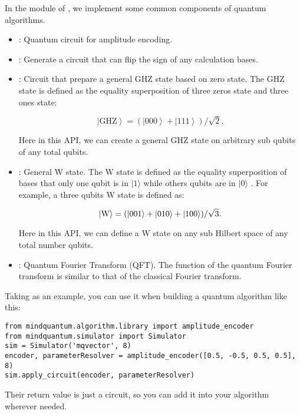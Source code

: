 In the \library module of \MindQuantum, we implement some common components of quantum algorithms.

\begin{itemize}

    \item \amplitudeencoder: Quantum circuit for amplitude encoding.

    \item \bitphaseflipoperator: Generate a circuit that can flip the sign of any calculation bases.

    \item \generalghzstate: Circuit that prepare a general GHZ state based on zero state. The GHZ state is defined as the equality superposition of three zeros state and three ones state:

          \begin{equation}
              \left|\text{GHZ}\right> = (\left|000\right> + \left|111\right>)/\sqrt{2}.
          \end{equation}

          Here in this API, we can create a general GHZ state on arbitrary sub qubits of any total qubits.

    \item \generalwstate: General W state. The W state is defined as the equality superposition of bases that only one qubit is in $|1\rangle$
          while others qubits are in $|0\rangle$
          . For example, a three qubits W state is defined as:

          \begin{equation}
              \left|\rm W\right> = (\left|001\right> + \left|010\right> + \left|100\right>)/\sqrt{3}.
          \end{equation}

          Here in this API, we can define a W state on any sub Hilbert space of any total number qubits.

    \item \qft: Quantum Fourier Transform (QFT). The function of the quantum Fourier transform is similar to that of the classical Fourier transform.
\end{itemize}

Taking \amplitudeencoder as an example, you can use it when building a quantum algorithm like this:
\begin{lstlisting}
from mindquantum.algorithm.library import amplitude_encoder
from mindquantum.simulator import Simulator
sim = Simulator('mqvector', 8)
encoder, parameterResolver = amplitude_encoder([0.5, -0.5, 0.5, 0.5], 8)
sim.apply_circuit(encoder, parameterResolver)
\end{lstlisting}
Their return value is just a circuit, so you can add it into your algorithm wherever needed.